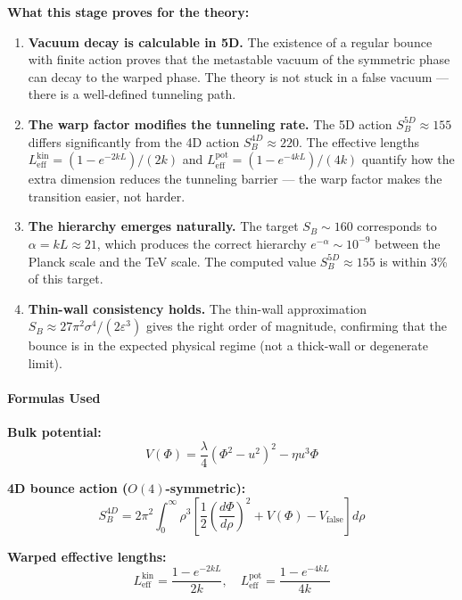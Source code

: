 \documentclass[
  11pt,
]{article}
\begin{document}
\textbf{What this stage proves for the theory:}

\begin{enumerate}
\def\labelenumi{\arabic{enumi}.}
\item
  \textbf{Vacuum decay is calculable in 5D.} The existence of a regular
  bounce with finite action proves that the metastable vacuum of the
  symmetric phase can decay to the warped phase. The theory is not stuck
  in a false vacuum --- there is a well-defined tunneling path.
\item
  \textbf{The warp factor modifies the tunneling rate.} The 5D action
  \(S_B^{5D} \approx 155\) differs significantly from the 4D action
  \(S_B^{4D} \approx 220\). The effective lengths
  \(L_{\text{eff}}^{\text{kin}} = (1 - e^{-2kL})/(2k)\) and
  \(L_{\text{eff}}^{\text{pot}} = (1 - e^{-4kL})/(4k)\) quantify how the
  extra dimension reduces the tunneling barrier --- the warp factor
  makes the transition easier, not harder.
\item
  \textbf{The hierarchy emerges naturally.} The target \(S_B \sim 160\)
  corresponds to \(\alpha = kL \approx 21\), which produces the correct
  hierarchy \(e^{-\alpha} \sim 10^{-9}\) between the Planck scale and
  the TeV scale. The computed value \(S_B^{5D} \approx 155\) is within
  3\% of this target.
\item
  \textbf{Thin-wall consistency holds.} The thin-wall approximation
  \(S_B \approx 27\pi^2\sigma^4/(2\varepsilon^3)\) gives the right order
  of magnitude, confirming that the bounce is in the expected physical
  regime (not a thick-wall or degenerate limit).
\end{enumerate}

\bigskip

\hypertarget{formulas-used-7}{%
\paragraph{Formulas Used}\label{formulas-used-7}}

\textbf{Bulk potential:}
\[V(\Phi) = \frac{\lambda}{4}(\Phi^2 - u^2)^2 - \eta u^3 \Phi \tag{137}\]

\textbf{4D bounce action (\(O(4)\)-symmetric):}
\[S_B^{4D} = 2\pi^2 \int_0^\infty \rho^3 \left[\frac{1}{2}\left(\frac{d\Phi}{d\rho}\right)^2 + V(\Phi) - V_{\text{false}}\right] d\rho \tag{138}\]

\textbf{Warped effective lengths:}
\[L_{\text{eff}}^{\text{kin}} = \frac{1 - e^{-2kL}}{2k}, \quad L_{\text{eff}}^{\text{pot}} = \frac{1 - e^{-4kL}}{4k} \tag{139}\]
\end{document}
